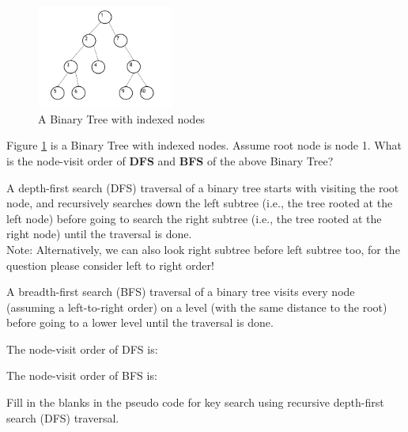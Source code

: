 \documentclass[11pt,addpoints,answers]{exam}
\numberwithin{equation}{section} %
\numberwithin{figure}{section} %
\numberwithin{table}{section} %
\begin{document}
\begin{questions}
    
    \begin{figure}[H]
        \centering
        \includegraphics[width = 0.4\textwidth]{TreePlot.png}
        \caption{A Binary Tree with indexed nodes}
        \label{tree}
    \end{figure}
    
    \question[2] Figure \ref{tree} is a Binary Tree with indexed nodes. Assume root node is node 1. What is the node-visit order of \textbf{DFS} and \textbf{BFS} of the above Binary Tree? 
    
    A depth-first search (DFS) traversal of a binary tree starts with visiting the root node, and recursively searches down the left subtree (i.e., the tree rooted at the left node) before going to search the right subtree (i.e., the tree rooted at the right node) until the traversal is done.\\
    Note: Alternatively, we can also look right subtree before left subtree too, for the question please consider left to right order!
    
    A breadth-first search (BFS) traversal of a binary tree visits every node (assuming a left-to-right order) on a level (with the same distance to the root) before going to a lower level until the traversal is done.
    
    The node-visit order of DFS is:
    
    \begin{tcolorbox}[fit,height=1cm, width=\textwidth, blank, borderline={1pt}{-2pt},nobeforeafter]
    \end{tcolorbox}
    
    The node-visit order of BFS is:
    
    \begin{tcolorbox}[fit,height=1cm, width=\textwidth, blank, borderline={1pt}{-2pt},nobeforeafter]
    \end{tcolorbox}
    
    
    \clearpage
    
    \question[2] Fill in the blanks in the pseudo code for key search using recursive depth-first search (DFS) traversal.
    

\end{questions}
\end{document}
